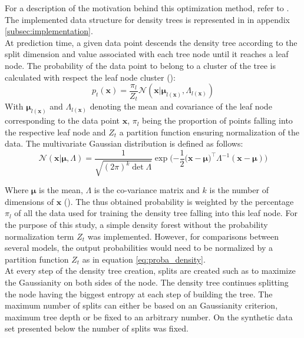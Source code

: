 \documentclass{article}
\begin{document}
For a description of the motivation behind this optimization method, refer to \cite{decisionForests-MSR}. The implemented data structure for density trees is represented in in appendix \ref{subsec:implementation}.\\

At prediction time, a given data point descends the density tree according to the split dimension and value associated with each tree node until it reaches a leaf node. The probability of the data point to belong to a cluster of the tree is calculated with respect the leaf node cluster (\cite{decisionForests-MSR}):
\begin{equation}
    \label{eq:proba_density}
    p_t(\boldsymbol{x}) = \frac{\pi_l}{Z_t}\mathcal{N}(\boldsymbol{x}|\boldsymbol{\mu}_{l(\boldsymbol{x})},\mathtt{\Lambda}_{l(\boldsymbol{x})})
\end{equation}
With $\boldsymbol{\mu}_{l(\boldsymbol{x})}$ and $\mathtt{\Lambda}_{l(\boldsymbol{x})}$ denoting the mean and covariance of the leaf node corresponding to the data point $\boldsymbol{x}$, $\pi_l$ being the proportion of points falling into the respective leaf node and $Z_t$ a partition function ensuring normalization of the data. The multivariate Gaussian distribution is defined as follows:
\begin{equation}
    \mathcal{N}(\boldsymbol{x}|\boldsymbol{\mu},\mathtt{\Lambda})=\frac{1}{\sqrt{(2\pi)^k\det\mathtt{\Lambda}}}\exp\Big({-\frac{1}{2}(\boldsymbol{x}-\boldsymbol{\mu}})^\top\mathtt{\Lambda}^{-1}(\boldsymbol{x}-\boldsymbol{\mu})\Big)
\end{equation}

Where $\boldsymbol{\mu}$ is the mean, $\mathtt{\Lambda}$ is the co-variance matrix and $k$ is the number of dimensions of $\boldsymbol{x}$ (\cite{scipy}). The thus obtained probability is weighted by the percentage $\pi_l$ of all the data used for training the density tree falling into this leaf node. For the purpose of this study, a simple density forest without the probability normalization term $Z_t$ was implemented. However, for comparisons between several models, the output probabilities would need to be normalized by a partition function $Z_t$ as in equation \ref{eq:proba_density}.\\

At every step of the density tree creation, splits are created such as to maximize the Gaussianity on both sides of the node. The density tree continues splitting the node having the biggest entropy at each step of building the tree. The maximum number of splits can either be based on an Gaussianity criterion, maximum tree depth or be fixed to an arbitrary number. On the synthetic data set presented below the number of splits was fixed.\\
\end{document}
